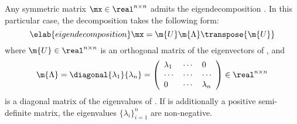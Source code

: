 Any symmetric matrix $\mx \in \real^{n \times n}$ admits the eigendecomposition
\cite{press2007}. In this particular case, the decomposition takes the following
form:
\begin{equation} \elab{eigendecomposition}
  \mx = \m{U} \m{\Lambda} \transpose{\m{U}}
\end{equation}
where $\m{U} \in \real^{n \times n}$ is an orthogonal matrix of the eigenvectors
of \mx, and
\[
  \m{\Lambda} = \diagonal{\lambda_1}{\lambda_n} = \left(
    \begin{array}{lll}
      \lambda_1 & \cdots & 0         \\
      \cdots    & \cdots & \cdots    \\
      0         & \cdots & \lambda_n
    \end{array}
  \right) \in \real^{n \times n}
\]
is a diagonal matrix of the eigenvalues of \mx. If \mx is additionally a
positive semi-definite matrix, the eigenvalues $\{ \lambda_i \}_{i = 1}^n$ are
non-negative.
